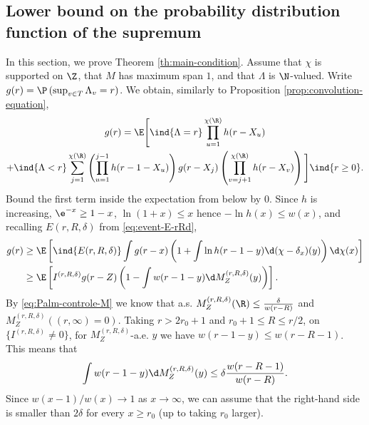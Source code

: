 \documentclass[10pt,a4paper]{article}
\begin{document}



\subsection{Lower bound on the probability distribution function of the supremum}
\label{sec:LLT}


In this section, we prove Theorem \ref{th:main-condition}. 
Assume that $\chi$ is supported on $\Z$, that $M$ has maximum span $1$, and that $\Lambda$ is $\N$-valued. 
Write $g(r) = \P\left(\sup_{v\in T} \Lambda_v = r\right)$. We obtain, similarly to Proposition \ref{prop:convolution-equation},
\begin{multline}\label{eq:convolution-LLT}
g(r) = \E\Bigg[ \ind{\Lambda = r} \prod_{u=1}^{\chi(\R)} h(r-X_u) \\
+ \ind{\Lambda < r} \sum_{j=1}^{\chi(\R)} \left(\prod_{u=1}^{j-1} h(r-1-X_u)\right) g(r-X_j) \left(\prod_{v=j+1}^{\chi(\R)} h(r-X_v) \right) \Bigg] \ind{r\geq 0} .
\end{multline}
Bound the first term inside the expectation from below by $0$. Since $h$ is increasing, $\e^{-x} \geq 1-x$, $\ln(1+x)\leq x$ hence $-\ln h(x) \leq w(x)$, and recalling $E(r,R,\delta)$ from \eqref{eq:event-E-rRd}, 
\begin{align}
g(r) &\geq \E\left[ \ind{E(r,R,\delta)} \int g(r-x) \left(1 + \int \ln h(r-1-y) \d(\chi-\delta_x)(y) \right) \d\chi(x) \right] \\
&\geq \E\left[ I^{(r,R,\delta)} g(r-Z) \left(1 - \int w(r-1-y) \d M_Z^{(r,R,\delta)}(y) \right) \right] .
\end{align}
By \eqref{eq:Palm-controle-M} we know that a.s. $M^{(r,R,\delta)}_Z(\R)\leq \frac{\delta}{w(r-R)}$ and $M_Z^{(r,R,\delta)}((r,\infty)=0)$. Taking $r>2r_0+1$ and $r_0+1\leq R \leq r/2$, on $\{I^{(r,R,\delta)}\neq 0\}$, for $M_Z^{(r,R,\delta)}$-a.e. $y$ we have $w(r-1-y) \leq w(r-R-1)$. 
This means that 
\begin{equation}\label{eq:bound-integral-M}
\int w(r-1-y) \d M_Z^{(r,R,\delta)}(y) \leq \delta \frac{w(r-R-1)}{w(r-R)} .
\end{equation}
Since $w(x-1)/w(x)\to 1$ as $x\to\infty$, we can assume that the right-hand side is smaller than $2\delta$ for every $x\geq r_0$ (up to taking $r_0$ larger). 
\end{document}
